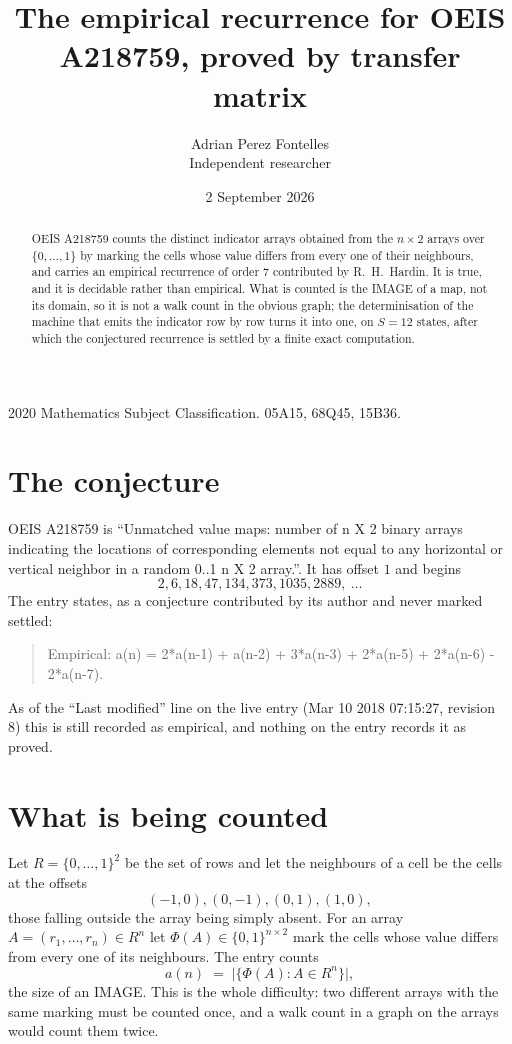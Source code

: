 \documentclass[11pt,a4paper]{article}
\title{The empirical recurrence for OEIS A218759, proved by transfer matrix}
\author{Adrian Perez Fontelles\\ \small Independent researcher}
\date{2 September 2026}
\theoremstyle{plain}
\theoremstyle{definition}
\begin{document}
\maketitle

\begin{abstract}
OEIS A218759 counts the distinct indicator arrays obtained from the $n\times2$ arrays over
$\{0,\dots,1\}$ by marking the cells whose value differs from every one of their neighbours, and carries an
empirical recurrence of order $7$ contributed by R.~H.~Hardin. It is true, and it is
decidable rather than empirical. What is counted is the IMAGE of a map, not its domain, so it
is not a walk count in the obvious graph; the determinisation of the machine that emits the
indicator row by row turns it into one, on $S=12$ states, after which the conjectured
recurrence is settled by a finite exact computation.
\end{abstract}

\noindent\small 2020 Mathematics Subject Classification. 05A15, 68Q45, 15B36.\normalsize

\section{The conjecture}

OEIS A218759 is ``Unmatched value maps: number of n X 2 binary arrays indicating the locations of corresponding elements not equal to any horizontal or vertical neighbor in a random 0..1 n X 2 array.''. It has offset $1$ and begins
\[
2, 6, 18, 47, 134, 373, 1035, 2889,\ \dots
\]
The entry states, as a conjecture contributed by its author and never marked settled:
\begin{quote}
Empirical: a(n) = 2*a(n-1) + a(n-2) + 3*a(n-3) + 2*a(n-5) + 2*a(n-6) - 2*a(n-7).
\end{quote}
As of the ``Last modified'' line on the live entry (Mar 10 2018 07:15:27, revision 8) this is still
recorded as empirical, and nothing on the entry records it as proved.

\section{What is being counted}

Let $R=\{0,\dots,1\}^{2}$ be the set of rows and let the neighbours of a cell be the
cells at the offsets
\[
(-1,0), (0,-1), (0,1), (1,0),
\]
those falling outside the array being simply absent. For an array
$A=(r_1,\dots,r_n)\in R^n$ let $\Phi(A)\in\{0,1\}^{n\times2}$ mark the cells whose value
differs from every one of its neighbours. The entry counts
\[
a(n)\;=\;\bigl|\{\Phi(A):A\in R^n\}\bigr| ,
\]
the size of an IMAGE. This is the whole difficulty: two different arrays with the same marking
must be counted once, and a walk count in a graph on the arrays would count them twice.
\end{document}
